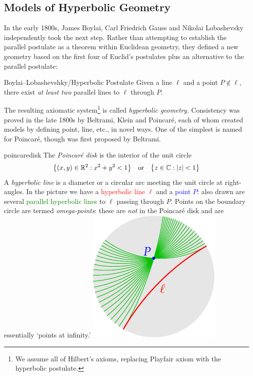 \clearpage



\subsection{Models of Hyperbolic Geometry}\label{sec:hyp-models}

In the early 1800s, James Boylai, Carl Friedrich Gauss and Nikolai Lobashevsky independently took the next step. Rather than attempting to establish the parallel postulate as a theorem within Euclidean geometry, they defined a new geometry based on the first four of Euclid's postulates plus an alternative to the parallel postulate:

\begin{axiom}{Boylai--Lobashevshky/Hyperbolic Postulate}{}
	Given a line $\ell$ and a point $P\not\in\ell$, there exist \emph{at least two} parallel lines to $\ell$ through $P$.
\end{axiom}

The resulting axiomatic system\footnote{We assume all of Hilbert's axioms, replacing Playfair axiom with the hyperbolic postulate.} is called \emph{hyperbolic geometry.} Consistency was proved in the late 1800s by Beltrami, Klein and Poincaré, each of whom created models by defining point, line, etc., in novel ways. One of the simplest is named for Poincaré, though was first proposed by Beltrami.

\begin{defn}[lower separated=false, sidebyside, sidebyside align=top seam, sidebyside gap=0pt, righthand width=0.3\linewidth]{}{poincaredisk}
	The \emph{Poincaré disk} is the interior of the unit circle
	\[
		\bigl\{(x,y)\in\mathbb{R}^2:x^2+y^2<1\bigr\}
		\quad\text{or}\quad
		\bigl\{z\in\mathbb{C}:\left| z\right|<1\bigr\}
	\]
	A \emph{hyperbolic line} is a diameter or a circular arc meeting the unit circle at right-angles.\smallbreak
	In the picture we have a \textcolor{red}{hyperbolic line $\ell$} and a \textcolor{blue}{point $P$}: also drawn are several \textcolor{Green}{parallel hyperbolic lines} to $\ell$ passing through $P$.\smallbreak
	Points on the boundary circle are termed \emph{omega-points}: these are \emph{not} in the Poincaré disk and are essentially `points at infinity.' 
	\tcblower
	\flushright\includegraphics{models-parallels}
\end{defn}


